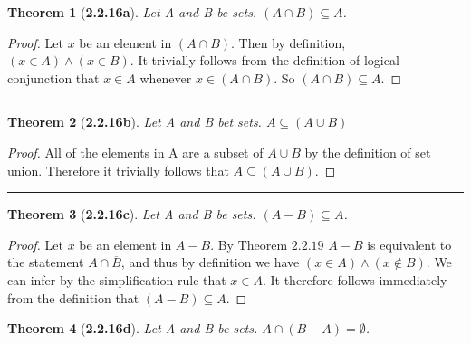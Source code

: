 \documentclass[a4paper, 12pt]{article}
\theoremstyle{plain}
\newtheorem*{theorem*}{Theorem}
\begin{document}
\begin{theorem*}[\textbf{2.2.16a}]
    Let A and B be sets. $(A \cap B) \subseteq A$.
\end{theorem*}

\begin{proof}
    Let $x$ be an element in $(A \cap B)$. Then by definition, $(x \in A) \land (x \in B)$. 
    It trivially follows from the definition of logical conjunction that $x \in A$ whenever 
    $x \in (A \cap B)$. So $(A \cap B) \subseteq A$. 
\end{proof}
\begin{center}
    \rule{5.4in}{1pt}
\end{center}


\begin{theorem*}[\textbf{2.2.16b}]
    Let A and B bet sets. $A \subseteq (A \cup B)$
\end{theorem*}

\begin{proof}
    All of the elements in A are a subset of $A \cup B$ by the definition of set union. 
    Therefore it trivially follows that $A \subseteq (A \cup B)$.
\end{proof}
\begin{center}
    \rule{5.4in}{1pt}
\end{center}


\begin{theorem*}[\textbf{2.2.16c}]
    Let A and B be sets. $(A - B) \subseteq A$.
\end{theorem*}

\begin{proof}
    Let $x$ be an element in $A - B$. By Theorem $2.2.19$ $A - B$ is equivalent to the 
    statement $A \cap \overline{B}$, and thus by definition we have 
    $(x \in A) \land (x \notin B)$. We can infer by the simplification rule that 
    $x \in A$. It therefore follows immediately from the definition that 
    $(A - B) \subseteq A$.
\end{proof}

\pagebreak


\begin{theorem*}[\textbf{2.2.16d}]
    Let A and B be sets. $A \cap (B - A) = \emptyset$.
\end{theorem*}
\end{document}
